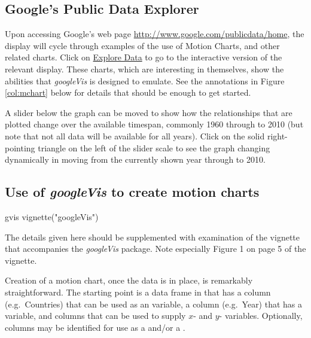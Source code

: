 \subsection{Google's Public Data Explorer}

Upon accessing Google's web page
\url{http://www.google.com/publicdata/home}, the display will cycle
through examples of the use of Motion Charts, and other related
charts.  Click on \underline{Explore Data} to go to the interactive
version of the relevant display.  These charts, which are interesting in themselves,
show the abilities that {\em googleVis} is designed to emulate.  See
the annotations in Figure \ref{col:mchart} below for details that
should be enough to get started.

A slider below the graph can be moved to show how the relationships
that are plotted change over the available timespan, commonly 1960
through to 2010 (but note that not all data will be available for all
years).  Click on the solid right-pointing triangle on the left of
the slider scale to see the graph changing dynamically in moving from the
currently shown year through to 2010.

\subsection{Use of {\em googleVis} to create motion charts}\label{ss:gvis}

\begin{SaveVerbatim}{gvis}
vignette("googleVis")
\end{SaveVerbatim}

The details given here should be supplemented with examination
of the vignette that accompanies the {\em
googleVis} package.  Note especially Figure 1 on page 5 of the
vignette.

Creation of a motion chart, once the data is in place, is remarkably
straightforward. The starting point is a data frame in that has a
column (e.g.\ Countries) that can be used as an  variable, a
column (e.g.\ Year) that has a  variable, and columns
that can be used to supply $x$- and $y$- variables.  Optionally,
columns may be identified for use as a  and/or a
.

